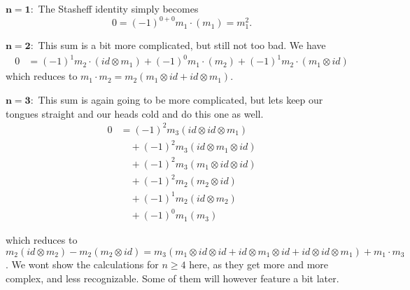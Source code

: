 $\mathbf{n=1 :}$ The Stasheff identity simply becomes
\begin{equation*}
    0 = (-1)^{0+0}m_1 \cdot (m_1) = m_1^2 .
\end{equation*}

$\mathbf{n=2 :}$ This sum is a bit more complicated, but still not too bad. We have
\begin{align*}
    0 
    &= (-1)^{1}m_2\cdot(id\otimes m_1)+(-1)^{0}m_1\cdot (m_2)+(-1)^{1}m_2\cdot (m_1\otimes id)
\end{align*}
which reduces to $m_1 \cdot m_2 = m_2(m_1\otimes id + id\otimes m_1)$. 

$\mathbf{n=3 :}$ This sum is again going to be more complicated, but lets keep our tongues straight and our heads cold and do this one as well. 
\begin{align*}
    0 
    &= (-1)^{2}m_3(id\otimes id \otimes m_1) \\
    &\quad + (-1)^{2}m_3(id\otimes m_1 \otimes id) \\
    &\quad + (-1)^{2}m_3(m_1\otimes id \otimes id) \\
    &\quad + (-1)^{2}m_2(m_2\otimes id) \\
    &\quad + (-1)^{1}m_2(id\otimes m_2) \\
    &\quad + (-1)^{0}m_1(m_3) 
\end{align*}

which reduces to $m_2(id\otimes m_2) - m_2(m_2\otimes id) = m_3(m_1\otimes id \otimes id + id\otimes m_1 \otimes id + id\otimes id \otimes m_1) + m_1\cdot m_3 $. We wont show the calculations for $n \geq 4$ here, as they get more and more complex, and less recognizable. Some of them will however feature a bit later.   

